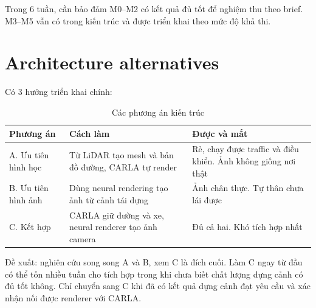 Trong 6 tuần, cần bảo đảm M0--M2 có kết quả đủ tốt để nghiệm thu theo brief.
M3--M5 vẫn có trong kiến trúc và được triển khai theo mức độ khả thi.

\section{Architecture alternatives}

Có 3 hướng triển khai chính:

\begin{table}[H]
  \centering
  \caption{Các phương án kiến trúc}
  \begin{tabularx}{\linewidth}{>{\raggedright\arraybackslash}p{3.2cm} X X}
    \toprule
    \textbf{Phương án} & \textbf{Cách làm} & \textbf{Được và mất} \\
    \midrule
    A. Ưu tiên hình học & Từ LiDAR tạo mesh và bản đồ đường, CARLA tự render & Rẻ, chạy được traffic và điều khiển. Ảnh không giống nơi thật \\
    \addlinespace
    B. Ưu tiên hình ảnh & Dùng neural rendering tạo ảnh từ cảnh tái dựng & Ảnh chân thực. Tự thân chưa lái được \\
    \addlinespace
    C. Kết hợp & CARLA giữ đường và xe, neural renderer tạo ảnh camera & Đủ cả hai. Khó tích hợp nhất \\
    \bottomrule
  \end{tabularx}
\end{table}

Đề xuất: nghiên cứu song song A và B, xem C là đích cuối.
Làm C ngay từ đầu có thể tốn nhiều tuần cho tích hợp trong khi chưa biết chất lượng dựng cảnh có đủ tốt không.
Chỉ chuyển sang C khi đã có kết quả dựng cảnh đạt yêu cầu và xác nhận nối được renderer với CARLA.
